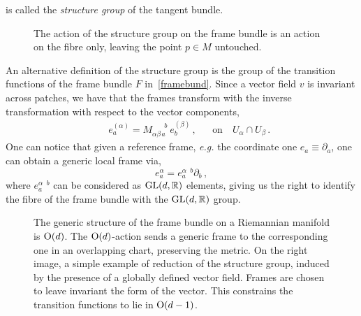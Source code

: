 \documentclass[debug]{phd}
\begin{document}
					is called the \emph{structure group} of the tangent bundle.
							\begin{figure}[h]
							\centering
								\scalebox{1.5}{}
								\caption{The action of the structure group on the frame bundle is an action on the fibre only, leaving the point $p \in M$ untouched.}
								\label{gactfibre}
							\end{figure}
					An alternative definition of the structure group is the group of the transition functions of the frame bundle $F$ in~\eqref{framebund}.
					Since a vector field $v$ is invariant across patches, we have that the frames transform with the inverse transformation with respect to the vector components,
							\begin{align}
								& & & & & & e_a^{(\alpha)} = M_{\alpha\beta\, a }^{\phantom{\alpha \beta a} b }\ e_b^{(\beta)}\, ,& & \mbox{on}\quad U_\alpha \cap U_\beta \, .& & & &
							\end{align}
					One can notice that given a reference frame, \emph{e.g.} the coordinate one $e_a \equiv \partial_a$, one can obtain a generic local frame via,
							\begin{equation}
								e^{\alpha}_a = e^{\alpha\phantom{a}b}_a \partial_b\, ,
							\end{equation}
					where $e^{\alpha\phantom{a}b}_a$ can be considered as $\mathrm{GL}(d,\mathbb{R})$ elements, giving us the right to identify the fibre of the frame bundle with the $\mathrm{GL}(d, \mathbb{R})$ group.
					
							\begin{figure}[h]
							\centering
									\scalebox{1}{}%
								\qquad \qquad
									\scalebox{1}{}
								\caption{%
									The generic structure of the frame bundle on a Riemannian manifold is $\mathrm{O}(d)$. 
									The $\mathrm{O}(d)$-action sends a generic frame to the corresponding one in an overlapping chart, preserving the metric. 
									On the right image, a simple example of reduction of the structure group, induced by the presence of a globally defined vector field.
									Frames are chosen to leave invariant the form of the vector.
									This constrains the transition functions to lie in $\mathrm{O}(d-1)$.}
								\label{figpatches}
							\end{figure}
\end{document}
